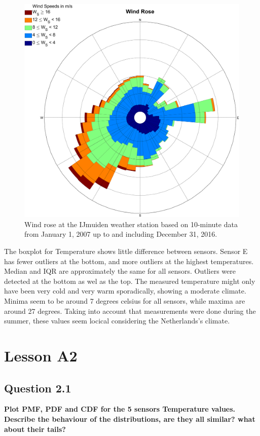 \documentclass{report}
\begin{document}
	\begin{figure}[H]
		\centering
		\includegraphics[width=0.7\linewidth]{GEO1001_hw01_images/WindRose_IJmuiden.png}
		\caption{ Wind rose at the IJmuiden weather station based on 10-minute data from January 1, 2007 up to and including December 31, 2016.}
		\label{fig:winddirnl}
	\end{figure}
	
	\newpage %
	The boxplot for Temperature shows little difference between sensors. Sensor E has fewer outliers at the bottom, and more outliers at the highest temperatures. Median and IQR are approximately the same for all sensors. Outliers were detected at the bottom as wel as the top. The measured temperature might only have been very cold and very warm sporadically, showing a moderate climate. Minima seem to be around 7 degrees celsius for all sensors, while maxima are around 27 degrees. Taking into account that measurements were done during the summer, these values seem locical considering the Netherlands's climate.
	
	
	\section{Lesson A2}
	
	\subsection{Question 2.1}
	\textbf{Plot PMF, PDF and CDF for the 5 sensors Temperature values. Describe the behaviour of the distributions, are they all similar? what about their tails?}
	
\end{document}
